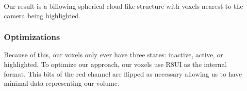 Our result is a billowing spherical cloud-like structure with voxels nearest to the camera being highlighted. 


\subsubsection{Optimizations}
Because of this, our voxels only ever have three states: inactive, active, or highlighted. To optimize our approach, our voxels use R8UI as the internal format. This bits of the red channel are flipped as necessary allowing us to have minimal data representing our volume.

